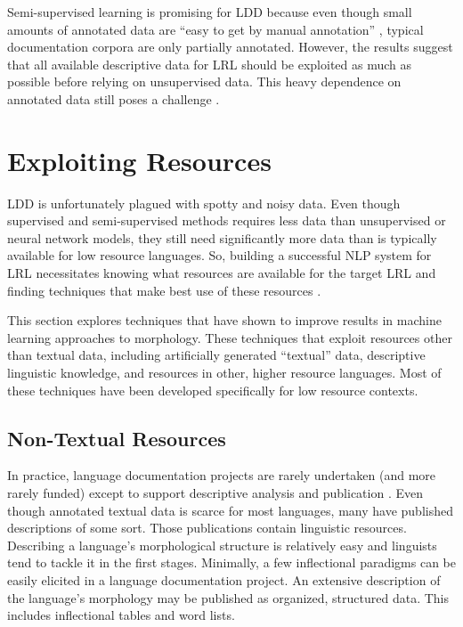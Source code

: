 \documentclass[12pt]{article}
\begin{document}
Semi-supervised learning is promising for LDD because even though small amounts of annotated data are ``easy to get by manual annotation'' \cite[page 49]{virpioja_empirical_2011}, typical documentation corpora are only partially annotated. However, the results suggest that all available descriptive data for LRL should be exploited as much as possible before relying on unsupervised data. This heavy dependence on annotated data still poses a challenge \cite{andrews_bayesian_2017}. 

\section{Exploiting Resources}
\label{resources}

LDD is unfortunately plagued with spotty and noisy data. Even though supervised and semi-supervised methods requires less data than unsupervised or neural network models, they still need significantly more data than is typically available for low resource languages. So, building a successful NLP system for LRL necessitates knowing what resources are available for the target LRL \cite{duong_natural_2017} and finding techniques that make best use of these resources \cite{palmer_semi-automated_2009}. 

This section explores techniques that have shown to improve results in machine learning approaches to morphology. These techniques that exploit resources other than textual data, including artificially generated ``textual'' data, descriptive linguistic knowledge, and resources in other, higher resource languages. Most of these techniques have been developed specifically for low resource contexts. 

\subsection{Non-Textual Resources}

In practice, language documentation projects are rarely undertaken (and more rarely funded) except to support descriptive analysis and publication \cite{thieberger_using_2012,austin_language_2014,vallejos_integrating_2014,thieberger_assessing_2016}. Even though annotated textual data is scarce for most languages, many have published descriptions of some sort. Those publications contain linguistic resources. Describing a language's morphological structure is relatively easy \cite{roark_computational_2007} and linguists tend to tackle it in the first stages. Minimally, a few inflectional paradigms can be easily elicited in a language documentation project. An extensive description of the language’s morphology may be published as organized, structured data. This includes inflectional tables and word lists.
\end{document}
